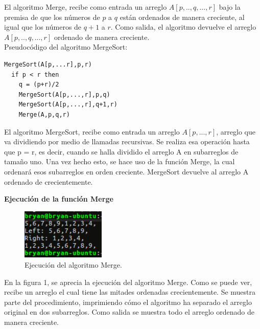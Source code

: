 \documentclass[12pt]{report}
\begin{document}
	El algoritmo Merge, recibe como entrada un arreglo $A[p,..,q,...,r]$ bajo la premisa de que los números de $p$ a $q$ están ordenados de manera creciente, al igual que los números de $q+1$ a $r$. Como salida, el algoritmo devuelve el arreglo $A[p,..,q,...,r]$ ordenado de manera creciente. \\

	Pseudocódigo del algoritmo MergeSort:
	\lstset{language=C, breaklines=true, basicstyle=\footnotesize}
	\lstset{numbers=left, numberstyle=\tiny, stepnumber=1, numbersep=10pt}
	\begin{lstlisting}
MergeSort(A[p,...r],p,r)
  if p < r then
    q = (p+r)/2
    MergeSort(A[p,...,r],p,q)
    MergeSort(A[p,...,r],q+1,r)
    Merge(A,p,q,r)
	\end{lstlisting}
	
	El algoritmo MergeSort, recibe como entrada un arreglo $A[p,...,r]$, arreglo que va dividiendo por medio de llamadas recursivas. Se realiza esa operación hasta que p = r, es decir, cuando se halla dividido el arreglo A en subarreglos de tamaño uno. Una vez hecho esto, se hace uso de la función Merge, la cual ordenará esos subarreglos en orden creciente. MergeSort devuelve al arreglo A ordenado de crecientemente.\newpage
	
	
	\textbf{Ejecución de la función Merge\\}
	\begin{figure}[H]
		\includegraphics[width=4cm]{imagenes/1.png}
		\centering
		\caption{Ejecución del algoritmo Merge.}
		\centering
	\end{figure}
	En la figura 1, se aprecia la ejecución del algoritmo Merge. Como se puede ver, recibe un arreglo el cual tiene las mitades ordenadas crecientemente. Se muestra parte del procedimiento, imprimiendo cómo el algoritmo ha separado el arreglo original en dos subarreglos. Como salida se muestra todo el arreglo ordenado de manera creciente.\\
	
\end{document}
